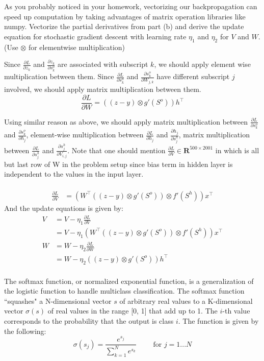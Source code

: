 \begin{Parts}
\Part
As you probably noticed in your homework, vectorizing our backpropagation can speed up computation by taking advantages of matrix operation libraries like numpy. Vectorize the partial derivatives from part (b) and derive the update equation for stochastic gradient descent with learning rate $\eta_1$ and $\eta_2$ for $V$ and $W$. (Use $\otimes$ for elementwise multiplication)

\begin{solution}
Since $\frac{\partial L}{\partial z_k}$ and $\frac{\partial z_k}{\partial s^o_k}$ are associated with subscript $k$, we should apply element wise multiplication between them. Since $\frac{\partial L}{\partial s^o_k}$ and $\frac{\partial s^o_k}{\partial W_{j, k}}$ have different subscript $j$ involved, we should apply matrix multiplication between them.
$$\frac{\partial L}{\partial W} = ((z-y)\otimes g'(S^o))h^\intercal$$

Using similar reason as above, we should apply matrix multiplication between $\frac{\partial L}{\partial s^o_k}$ and $\frac{\partial s^o_k}{\partial h_j}$, element-wise multiplication between $\frac{\partial L}{\partial h_j}$ and $\frac{\partial h_j}{\partial s^h_j}$, matrix multiplication between $\frac{\partial L}{\partial s^h_j}$ and $\frac{\partial s^h_j}{\partial V_{i, j}}$. Note that one should mention $\frac{\partial L}{\partial V} \in \textbf{R}^{500\times 2001}$ in which is all but last row of W in the problem setup since bias term in hidden layer is independent to the values in the input layer.

\begin{align*}
    \\
    \frac{\partial L}{\partial V} &= (W^\intercal ((z-y)\otimes g'(S^o)) \otimes f'(S^h)) x^\intercal
\end{align*}
And the update equations is given by:
\begin{align*}
    V &= V - \eta_1 \frac{\partial L}{\partial V}\\
      &= V - \eta_1 (W^\intercal ((z-y)\otimes g'(S^o)) \otimes f'(S^h)) x^\intercal \\
    W &= W - \eta_2 \frac{\partial L}{\partial W}\\
      &= W - \eta_2 ((z-y)\otimes g'(S^o))h^\intercal\\
\end{align*}
\end{solution}

\Part
The softmax function, or normalized exponential function, is a generalization of the logistic function to handle multiclass classification. The softmax function ``squashes" a N-dimensional vector $s$ of arbitrary real values to a K-dimensional vector $\sigma(s)$ of real values in the range [0, 1] that add up to 1. The $i$-th value corresponds to the probability that the output is class $i$. The function is given by the following:
$$ \sigma(s_j) = \dfrac{e^{s_j}}{\sum_{k=1}^N e^{s_k}} \qquad
\text{ for } j = 1 ... N $$ 


\end{Parts}
